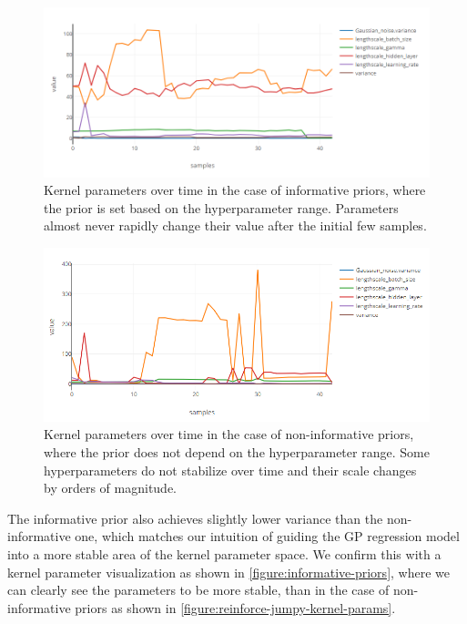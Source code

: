 \begin{figure}
	\begin{center}
		\includegraphics[width=1.0\textwidth]{images/informative-priors.png}
		\caption{Kernel parameters over time in the case of informative priors, where the prior is set based on the hyperparameter range. Parameters almost never rapidly change their value after the initial few samples.}
		\label{figure:informative-priors}
	\end{center}
\end{figure}

\begin{figure}
	\begin{center}
		\includegraphics[width=1.0\textwidth]{images/reinforce-jumpy-kernel-params.png}
		\caption{Kernel parameters over time in the case of non-informative priors, where the prior does not depend on the hyperparameter range. Some hyperparameters do not stabilize over time and their scale changes by orders of magnitude.}
		\label{figure:reinforce-jumpy-kernel-params}
	\end{center}
\end{figure}


The informative prior also achieves slightly lower variance than the
non-informative one, which matches our intuition of guiding the GP regression
model into a more stable area of the kernel parameter space. We confirm this
with a kernel parameter visualization as shown in
\autoref{figure:informative-priors}, where we can clearly see the parameters to
be more stable, than in the case of non-informative priors as shown in
\autoref{figure:reinforce-jumpy-kernel-params}.

